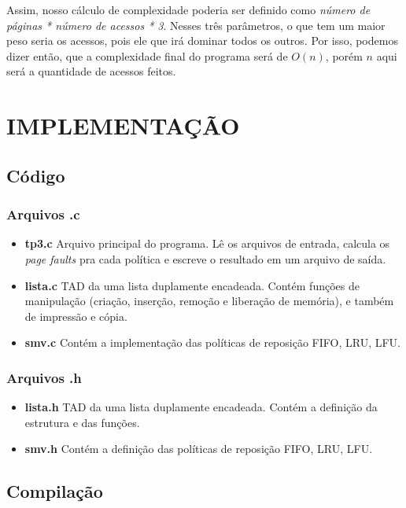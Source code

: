 \documentclass[12pt]{article}
\begin{document}
Assim, nosso cálculo de complexidade poderia ser definido como \textit{número de páginas * número de acessos * 3}. Nesses três parâmetros, o que tem um maior peso seria os acessos, pois ele que irá dominar todos os outros. Por isso, podemos dizer então, que a complexidade final do programa será de $O(n)$, porém $n$ aqui será a quantidade de acessos feitos.

\section{IMPLEMENTAÇÃO}
\label{implementacao}

\subsection{Código}

\subsubsection{Arquivos .c}

\begin{itemize}
\item \textbf{tp3.c} Arquivo principal do programa. Lê os arquivos de entrada, calcula os \textit{page faults} pra cada política e escreve o resultado em um arquivo de saída.
\item \textbf{lista.c} TAD da uma lista duplamente encadeada. Contém funções de manipulação (criação, inserção, remoção e liberação de memória), e também de impressão e cópia.
\item \textbf{smv.c} Contém a implementação das políticas de reposição FIFO, LRU, LFU.
\end{itemize}

\subsubsection{Arquivos .h}

\begin{itemize}
\item \textbf{lista.h} TAD da uma lista duplamente encadeada. Contém a definição da estrutura e das funções.
\item \textbf{smv.h} Contém a definição das políticas de reposição FIFO, LRU, LFU.
\end{itemize}

\subsection{Compilação}
\end{document}
